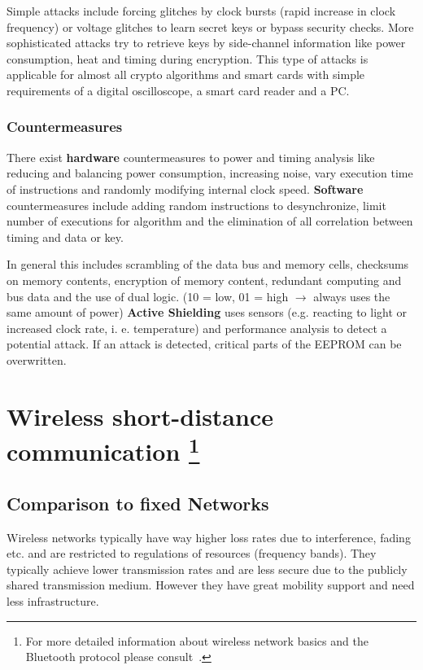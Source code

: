 \documentclass{article}
\begin{document}
\begin{multicols}{2}
Simple attacks include forcing glitches by clock bursts (rapid increase in
clock frequency) or voltage glitches to learn secret keys or bypass security
checks. More sophisticated attacks try to retrieve keys by side-channel
information like power consumption, heat and timing during encryption. This type
of attacks is applicable for almost all crypto algorithms and smart cards with
simple requirements of a digital oscilloscope, a smart card reader and a PC.

\subsubsection{Countermeasures}

There exist {\bf hardware} countermeasures to power and timing analysis like
reducing and balancing power consumption, increasing noise, vary execution time
of instructions and randomly modifying internal clock speed. {\bf Software}
countermeasures include adding random instructions to desynchronize, limit
number of executions for algorithm and the elimination of all correlation
between timing and data or key.

In general this includes scrambling of the data bus and memory cells, checksums
on memory contents, encryption of memory content, redundant computing and bus
data and the use of dual logic. (10 = low, 01 = high $\rightarrow$ always uses the same amount of
power) {\bf Active Shielding} uses sensors (e.g. reacting to light or increased
clock rate, i. e. temperature) and performance analysis to detect a potential
attack. If an attack is detected, critical parts of the EEPROM can be
overwritten.

\section[Wireless short-distance communication]{Wireless short-distance
communication%
\footnote{For more detailed information about wireless network basics and the
Bluetooth protocol please consult~\cite{acn-summary}.}
}

\subsection{Comparison to fixed Networks}
Wireless networks typically have way higher loss rates due to interference,
fading etc. and are restricted to regulations of resources (frequency bands).
They typically achieve lower transmission rates and are less secure due to the
publicly shared transmission medium. However they have great mobility support
and need less infrastructure.


\end{multicols}
\end{document}
